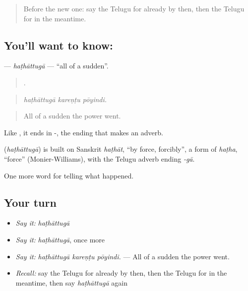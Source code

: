 \label{lesson:TE-C332-hathattuga}



\begin{quote}
Before the new one: say the Telugu for already by then, then the Telugu for in the meantime.
\end{quote}

\subsection*{You'll want to know: }
\textbf{} — \emph{haṭhāttugā} — \textquotedblleft{}all of a sudden\textquotedblright{}.

\begin{quote}
  .
\end{quote}

\begin{quote}
\emph{haṭhāttugā kareṇṭu pōyindi.}
\end{quote}

\begin{quote}
All of a sudden the power went.
\end{quote}

Like , it ends in -, the ending that makes an adverb.

\begin{cousinweb}
\textbf{} (\emph{haṭhāttugā}) is built on Sanskrit \emph{haṭhāt}, \textquotedblleft{}by force, forcibly\textquotedblright{}, a form of \emph{haṭha}, \textquotedblleft{}force\textquotedblright{} (Monier-Williams), with the Telugu adverb ending \emph{-gā}.
\end{cousinweb}

\begin{grammarlens}[title={What you've built}]
One more word for telling what happened.
\end{grammarlens}

\subsection*{Your turn}
\begin{itemize}
\raggedright
  \item \emph{Say it:} \emph{haṭhāttugā}
  \item \emph{Say it:} \emph{haṭhāttugā}, once more
  \item \emph{Say it:} \emph{haṭhāttugā kareṇṭu pōyindi.} — All of a sudden the power went.
  \item \emph{Recall:} say the Telugu for already by then, then the Telugu for in the meantime, then say \emph{haṭhāttugā} again
\end{itemize}


